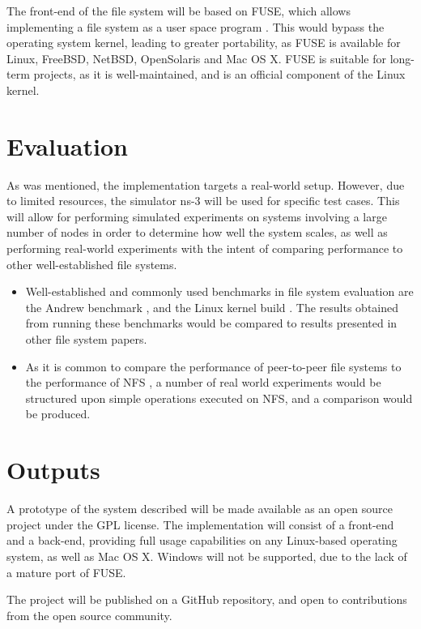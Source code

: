 \documentclass[a4paper, 11pt]{article}
\begin{document}
The front-end of the file system will be based on FUSE, which allows implementing a file system as a user space program \cite{fuse}. This would bypass the operating system kernel, leading to greater portability, as FUSE is available for Linux, FreeBSD, NetBSD, OpenSolaris and Mac OS X. FUSE is suitable for long-term projects, as it is well-maintained, and is an official component of the Linux kernel.

\section{Evaluation}

As was mentioned, the implementation targets a real-world setup. However, due to limited resources, the simulator ns-3 \cite{ns3} will be used for specific test cases. This will allow for performing simulated experiments on systems involving a large number of nodes in order to determine how well the system scales, as well as performing real-world experiments with the intent of comparing performance to other well-established file systems.

\begin{itemize}
\item Well-established and commonly used benchmarks in file system evaluation are the Andrew benchmark \cite{andrew}, and the Linux kernel build \cite{kernelb}. The results obtained from running these benchmarks would be compared to results presented in other file system papers.

\item As it is common to compare the performance of peer-to-peer file systems to the performance of NFS \cite{oceanstore} \cite{ivy} \cite{pastis}, a number of real world experiments would be structured upon simple operations executed on NFS, and a comparison would be produced.
\end{itemize}

\section{Outputs}

A prototype of the system described will be made available as an open source project under the GPL \cite{gpl} license. The implementation will consist of a front-end and a back-end, providing full usage capabilities on any Linux-based operating system, as well as Mac OS X. Windows will not be supported, due to the lack of a mature port of FUSE. 

The project will be published on a GitHub \cite{github} repository, and open to contributions from the open source community.
\end{document}
